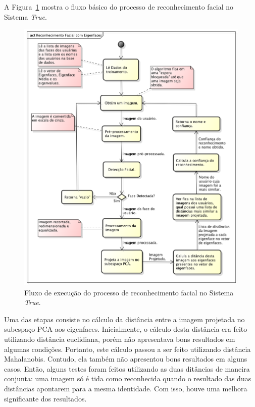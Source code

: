 		A Figura~\ref{fig:diagrama-reconhecimento} mostra o fluxo básico do processo de reconhecimento facial no Sistema \textit{True}.

			\begin{figure}[H]
			\begin{center}
				\includegraphics[scale=0.5]{figuras/4.ProblemaEProposta/diagrama-reconhecimento.png}
			\end{center}
			\caption{Fluxo de execução do processo de reconhecimento facial no Sistema \textit{True}.}
			\label{fig:diagrama-reconhecimento}
		\end{figure}

		Uma das etapas consiste no cálculo da distância entre a imagem projetada no subespaço PCA aos eigenfaces. Inicialmente, o cálculo desta distância era feito utilizando distância euclidiana, porém não apresentava bons resultados em algumas condições. Portanto, este cálculo passou a ser feito utilizando distância Mahalanobis. Contudo, ela também não apresentou bons resultados em alguns casos. Então, alguns testes foram feitos utilizando as duas ditâncias de maneira conjunta: uma imagem só é tida como reconhecida quando o resultado das duas distâncias apontarem para a mesma identidade. Com isso, houve uma melhora significante dos resultados.

